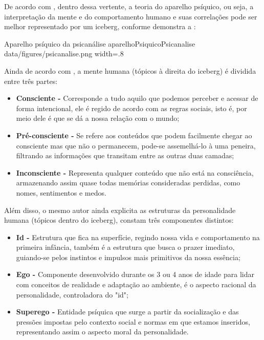 De acordo com , dentro dessa vertente, a teoria do aparelho psíquico, ou seja, a interpretação da mente e do comportamento humano e suas correlações pode ser melhor representado por um iceberg, conforme demonstra a :

\image
    {Aparelho psíquico da psicanálise}
    {aparelhoPsiquicoPsicanalise}
    {data/figures/psicanalise.png}
    {width=.8\textwidth}
    {}

Ainda de acordo com , a mente humana (tópicos à direita do iceberg) é dividida entre três partes:
\begin{itemize}
    \item \textbf{Consciente -} Corresponde a tudo aquilo que podemos perceber e acessar de forma intencional, ele é regido de acordo com as regras sociais, isto é, por meio dele é que se dá a nossa relação com o mundo;
    \item \textbf{Pré-consciente -} Se refere aos conteúdos que podem facilmente chegar ao consciente mas que não o permanecem, pode-se assemelhá-lo à uma peneira, filtrando as informações que transitam entre as outras duas camadas;
    \item \textbf{Inconsciente -} Representa qualquer conteúdo que não está na consciência, armazenando assim quase todas memórias consideradas perdidas, como nomes, sentimentos e medos.
\end{itemize}

Além disso, o mesmo autor ainda explicita as estruturas da personalidade humana (tópicos dentro do iceberg), constam três componentes distintos:
\begin{itemize}
    \item \textbf{Id -} Estrutura que fica na superfície, regindo nossa vida e comportamento na primeira infância, também é a estrutura que busca o prazer imediato, guiando-se pelos instintos e impulsos mais primitivos da nossa essência;
    \item \textbf{Ego -} Componente desenvolvido durante os 3 ou 4 anos de idade para lidar com conceitos de realidade e adaptação ao ambiente, é o aspecto racional da personalidade, controladora do "id";
    \item \textbf{Superego - } Entidade psíquica que surge a partir da socialização e das pressões impostas pelo contexto social e normas em que estamos inseridos, representando assim o aspecto moral da personalidade. 
\end{itemize}

